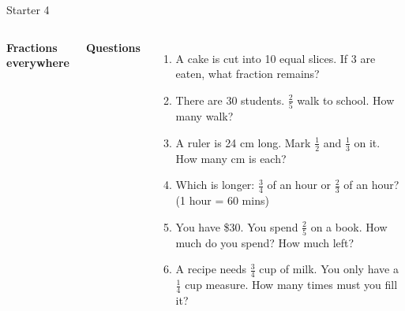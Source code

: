 \documentclass{beamer}
\begin{document}
\begin{frame}{Starter 4}

\begin{columns}
\begin{center}
\textbf{Fractions everywhere}
\end{center}

\textbf{Questions}
\begin{enumerate}
    \item A cake is cut into 10 equal slices. If 3 are eaten, what fraction remains?
    \item There are 30 students. $\frac{2}{5}$ walk to school. How many walk?
    \item A ruler is 24 cm long. Mark $\frac{1}{2}$ and $\frac{1}{3}$ on it. How many cm is each?
    \item Which is longer: $\frac{3}{4}$ of an hour or $\frac{2}{3}$ of an hour? (1 hour = 60 mins)
    \item You have \$30. You spend $\frac{2}{5}$ on a book. How much do you spend? How much left?
    \item A recipe needs $\frac{3}{4}$ cup of milk. You only have a $\frac{1}{4}$ cup measure. How many times must you fill it?
\end{enumerate}
\end{columns}

\end{frame}
\end{document}
